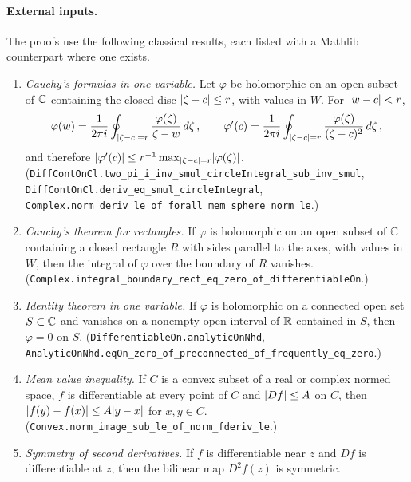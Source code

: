 \paragraph{External inputs.} The proofs use the following classical results, each listed with a
Mathlib counterpart where one exists.
{\raggedright
\begin{enumerate}[label=(E\arabic*),ref=(E\arabic*)]
\item\label{bp:p1:ext-cauchy} \emph{Cauchy's formulas in one variable.} Let $\varphi$ be holomorphic on
  an open subset of $\mathbb{C}$ containing the closed disc $\lvert \zeta-c\rvert\le r$, with values in $W$. For
  $\lvert w-c\rvert<r$,
  \begin{equation*}
  \varphi(w)=\frac1{2\pi i}\oint_{\lvert \zeta-c\rvert=r}\frac{\varphi(\zeta)}{\zeta-w}\,d\zeta\,,\qquad
  \varphi'(c)=\frac1{2\pi i}\oint_{\lvert \zeta-c\rvert=r}\frac{\varphi(\zeta)}{(\zeta-c)^2}\,d\zeta\,,
  \end{equation*}
  and therefore $\lvert \varphi'(c)\rvert\le r^{-1}\max_{\lvert \zeta-c\rvert=r}\lvert \varphi(\zeta)\rvert$.
  (\nolinkurl{DiffContOnCl.two_pi_i_inv_smul_circleIntegral_sub_inv_smul},
  \nolinkurl{DiffContOnCl.deriv_eq_smul_circleIntegral},
  \nolinkurl{Complex.norm_deriv_le_of_forall_mem_sphere_norm_le}.)
\item\label{bp:p1:ext-rectangle} \emph{Cauchy's theorem for rectangles.} If $\varphi$ is holomorphic on
  an open subset of $\mathbb{C}$ containing a closed rectangle $R$ with sides parallel to the axes, with values
  in $W$, then the integral of $\varphi$ over the boundary of $R$ vanishes.
  (\nolinkurl{Complex.integral_boundary_rect_eq_zero_of_differentiableOn}.)
\item\label{bp:p1:ext-identity} \emph{Identity theorem in one variable.} If $\varphi$ is holomorphic on a
  connected open set $S\subset\mathbb{C}$ and vanishes on a nonempty open interval of $\mathbb{R}$ contained in $S$, then
  $\varphi=0$ on $S$. (\nolinkurl{DifferentiableOn.analyticOnNhd},
  \nolinkurl{AnalyticOnNhd.eqOn_zero_of_preconnected_of_frequently_eq_zero}.)
\item\label{bp:p1:ext-mvt} \emph{Mean value inequality.} If $C$ is a convex subset of a real or complex
  normed space, $f$ is differentiable at every point of $C$ and $\lvert Df\rvert\le A$ on $C$, then
  $\lvert f(y)-f(x)\rvert\le A\lvert y-x\rvert$ for $x,y\in C$.
  (\nolinkurl{Convex.norm_image_sub_le_of_norm_fderiv_le}.)
\item\label{bp:p1:ext-schwarz} \emph{Symmetry of second derivatives.} If $f$ is differentiable near $z$
  and $Df$ is differentiable at $z$, then the bilinear map $D^2f(z)$ is symmetric.

\end{enumerate}}

